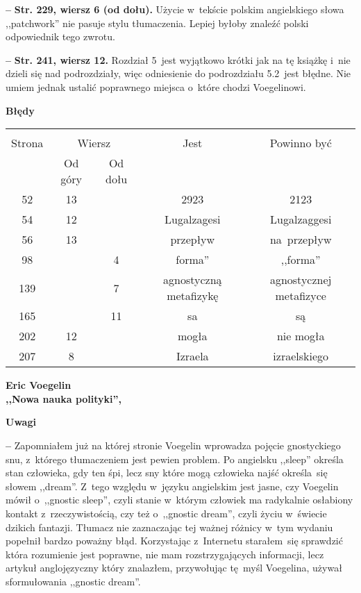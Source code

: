 \documentclass[a4paper,11pt]{article}
\newcommand{\spaceOne}{2em}
\newcommand{\spaceThree}{0.25em}
\newcommand{\tb}{\textbf}
\newcommand{\noi}{\noindent}
\newcommand{\start}{\noi \tb{--} {}}
\newcommand{\Center}[1]{\begin{center} #1 \end{center}}
\newcommand{\CenterTB}[1]{\Center{\tb{#1}}}
\newcommand{\StrWg}[2]{\tb{Str. #1, wiersz #2.}}
\newcommand{\StrWd}[2]{\tb{Str. #1, wiersz #2 (od dołu).}}
\newcommand{\Work}[1]{ \begin{center} {\large \tb{#1}} \end{center} }
\begin{document}
\vspace{\spaceThree}


\start \StrWd{229}{6} Użycie w~tekście polskim angielskiego słowa
,,patchwork'' nie pasuje stylu tłumaczenia. Lepiej byłoby znaleźć
polski odpowiednik tego zwrotu.

\vspace{\spaceThree}


\start \StrWg{241}{12} Rozdział 5~jest wyjątkowo krótki jak na tę
książkę i~nie dzieli się nad podrozdziały, więc odniesienie do
podrozdziału 5.2~jest błędne. Nie umiem jednak ustalić poprawnego
miejsca o~które chodzi Voegelinowi.

\CenterTB{Błędy}
\begin{center}
  \begin{tabular}{|c|c|c|c|c|}
    \hline
    & \multicolumn{2}{c|}{} & & \\
    Strona & \multicolumn{2}{c|}{Wiersz}& Jest & Powinno być \\ \cline{2-3}
    & Od góry & Od dołu &  &  \\ \hline
    52 & 13 & & 2923 & 2123 \\
    54 & 12 & & Lugalzagesi & Lugalzaggesi \\
    56 & 13 & & przepływ & na~przepływ \\
    98 & & 4 & forma'' & ,,forma'' \\
    139 & & 7 & agnostyczną metafizykę & agnostycznej metafizyce \\
    165 & & 11 & sa & są \\
    202 & 12 & & mogła & nie mogła \\
    207 & 8 & & Izraela & izraelskiego \\
    \hline
  \end{tabular}
\end{center}

\vspace{\spaceOne}





\Work{
  Eric Voegelin \\
  ,,Nowa nauka polityki'', \cite{Voe92} }


\CenterTB{Uwagi}

\start Zapomniałem już na której stronie Voegelin wprowadza pojęcie
gnostyckiego snu, z~którego tłumaczeniem jest pewien problem. Po
angielsku ,,sleep'' określa stan człowieka, gdy ten śpi, lecz sny
które mogą człowieka najść określa~się słowem ,,dream''. Z~tego
względu w~języku angielskim jest jasne, czy Voegelin mówił o~,,gnostic
sleep'', czyli stanie w~którym człowiek ma radykalnie osłabiony
kontakt z~rzeczywistością, czy też o~,,gnostic dream'', czyli życiu
w~świecie dzikich fantazji. Tłumacz nie zaznaczając tej ważnej różnicy
w~tym wydaniu popełnił bardzo poważny błąd. Korzystając z~Internetu
starałem~się sprawdzić która rozumienie jest poprawne, nie mam
rozstrzygających informacji, lecz artykuł anglojęzyczny który
znalazłem, przywołując tę~myśl Voegelina, używał sformułowania
,,gnostic dream''.
\end{document}
